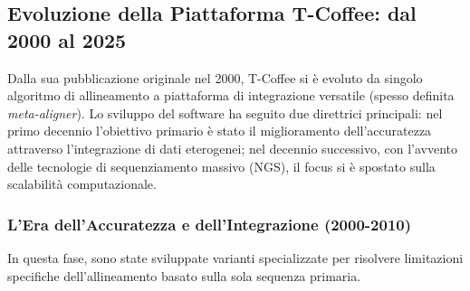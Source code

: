 \subsection{Evoluzione della Piattaforma T-Coffee: dal 2000 al 2025}
\label{subsec:tcoffee_evolution}

Dalla sua pubblicazione originale nel 2000, T-Coffee si è evoluto da singolo algoritmo di allineamento a piattaforma di integrazione versatile (spesso definita \textit{meta-aligner}). Lo sviluppo del software ha seguito due direttrici principali: nel primo decennio l'obiettivo primario è stato il miglioramento dell'accuratezza attraverso l'integrazione di dati eterogenei; nel decennio successivo, con l'avvento delle tecnologie di sequenziamento massivo (NGS), il focus si è spostato sulla scalabilità computazionale.

\subsubsection{L'Era dell'Accuratezza e dell'Integrazione (2000-2010)}
In questa fase, sono state sviluppate varianti specializzate per risolvere limitazioni specifiche dell'allineamento basato sulla sola sequenza primaria.

